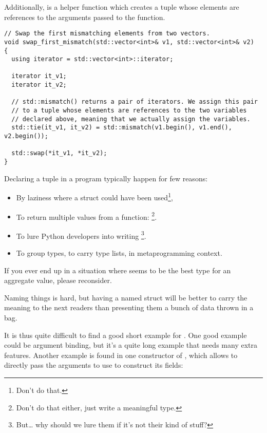 Additionally,  is a helper function which creates a
tuple whose elements are references to the arguments passed to the
function.

\begin{lstlisting}
// Swap the first mismatching elements from two vectors.
void swap_first_mismatch(std::vector<int>& v1, std::vector<int>& v2)
{
  using iterator = std::vector<int>::iterator;

  iterator it_v1;
  iterator it_v2;

  // std::mismatch() returns a pair of iterators. We assign this pair
  // to a tuple whose elements are references to the two variables
  // declared above, meaning that we actually assign the variables.
  std::tie(it_v1, it_v2) = std::mismatch(v1.begin(), v1.end(), v2.begin());

  std::swap(*it_v1, *it_v2);
}
\end{lstlisting}

\bigskip

Declaring a tuple in a \cpp{} program typically happen for few reasons:
\begin{itemize}
\item By laziness where a struct could have been used\footnote{Don't
  do that.},
\item To return multiple values from a function:
  \footnote{Don't do
    that either, just write a meaningful type.}.
\item To lure Python developers into writing \cpp{}\footnote{But… why
  should we lure them if it's not their kind of stuff?}.
\item To group types, to carry type lists, in metaprogramming context.
\end{itemize}

\begin{guideline}
If you ever end up in a situation where  seems to be
the best type for an aggregate value, please reconsider.

Naming things is hard, but having a named struct will be better to
carry the meaning to the next readers than presenting them a bunch of
data thrown in a bag.
\end{guideline}

It is thus quite difficult to find a good short example for
. One good example could be argument binding, but
it's a quite long example that needs many extra features. Another
example is found in one constructor of , which allows
to directly pass the arguments to use to construct its fields:

